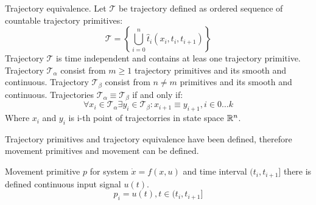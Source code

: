 \begin{definition}{Trajectory equivalence.}
Let $\mathscr{T}$ be trajectory defined as ordered sequence of countable trajectory primitives:
\begin{equation}
    \mathscr{T} = \left\{ \bigcup_{i=0}^n \hat{t}_i(x_i,t_i,t_{i+1}) \right\}
\end{equation}
Trajectory $\mathscr{T}$ is time independent and contains at leas one trajectory primitive. Trajectory $\mathscr{T}_\alpha$ consist from $m\ge 1$ trajectory primitives and its smooth and continuous. Trajectory $\mathscr{T}_\beta$ consist from $n \ne m$ primitives and its smooth and continuous.  Trajectories $\mathscr{T}_\alpha \equiv \mathscr{T}_\beta$ if and only if:
\begin{equation}
    \forall x_i \in \mathscr{T}_\alpha \exists y_i \in \mathscr{T}_\beta: x_{i+1} \equiv y_{i+1}, i \in {0\dots k}
\end{equation}
Where $x_i$ and $y_i$ is i-th point of trajectorries in state space $\mathbb{R}^n$.
\end{definition}

\noindent Trajectory primitives and trajectory equivalence have been defined, therefore movement primitives and movement can be defined.

\begin{definition}{Movement primitive $p$} 
for system $\dot{x} = f(x,u)$ and time interval $(t_i,t_{i+1}]$ there is defined continuous input signal $u(t)$.
\begin{equation}
    p_i = u(t), t\in (t_i,t_{i+1}]
\end{equation}
\end{definition}

